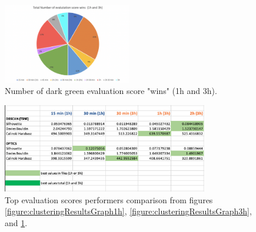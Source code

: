 
\begin{figure}
  \centering
  \includegraphics[width=0.5\textwidth]{./images/clusteringResults/clusteringResultsGraphTotal.png}
  \caption{Number of dark green evaluation score "wins" (1h and 3h).}
  \label{figure:clusteringResultsGraphTotal}
\end{figure}









\begin{figure}
  \centering
  \includegraphics[width=0.8\textwidth]{./images/clusteringResults/clusteringResults8.png}
  \caption{Top evaluation scores performers comparison from figures \ref{figure:clusteringResultsGraph1h}, \ref{figure:clusteringResultsGraph3h}, and \ref{figure:clusteringResultsGraphTotal}.}
  \label{figure:clusteringResults8}
\end{figure}

